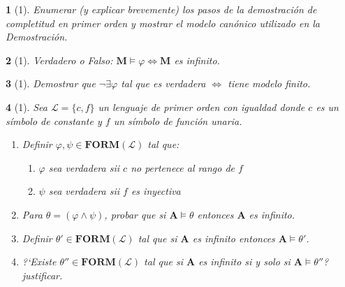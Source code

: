 \documentclass[leqno, 12pt, twoside,letterpaper]{book}
\theoremstyle{plain}
\newtheorem{ej}{}
\theoremstyle{definition}
\newcommand{\ba}[0]{\bm{A}}
\newcommand{\FORM}[0]{\bm{FORM}}
\newcommand{\sii}[0]{\Longleftrightarrow}
\begin{document}
\begin{ej}[1]
   Enumerar (y explicar brevemente) los pasos de la demostración de completitud
    en primer orden y mostrar el modelo canónico utilizado en la Demostración.
\end{ej}


\begin{ej}[1]
    Verdadero o Falso: $\bm{M} \models \varphi \sii \bm{M}$ es infinito.
\end{ej}

\begin{ej}[1]
    Demostrar que $\lnot\exists\varphi$ tal que es verdadera $\sii$ tiene modelo
    finito.
\end{ej}

\begin{ej}[1]
    Sea $\mathcal{L} = \{c, f\}$ un lenguaje de primer orden con igualdad donde
    $c$ es un símbolo de constante y $f$ un símbolo de función unaria.
    \begin{enumerate}
        \item Definir $\varphi, \psi \in \FORM(\mathcal{L})$ tal que:
            \begin{enumerate}
                \item $\varphi$ sea verdadera sii $c$ no pertenece al rango de
                    $f$
                \item $\psi$ sea verdadera sii $f$ es inyectiva
            \end{enumerate}
        \item Para $\theta = (\varphi \land \psi)$, probar que si $\ba \models
            \theta$ entonces $\ba$ es infinito.
        \item Definir $\theta' \in \FORM(\mathcal{L})$ tal que si $\ba$ es
            infinito entonces $\ba \models \theta'$.
        \item ?`Existe $\theta'' \in \FORM(\mathcal{L})$ tal que si $\ba$ es
            infinito si y solo si $\ba \models \theta''$? justificar.
    \end{enumerate}
\end{ej}
\end{document}
